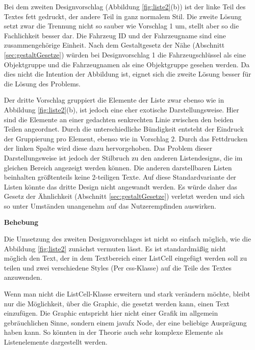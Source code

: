 Bei dem zweiten Designvorschlag (Abbildung \ref{fig:liste2}(b)) ist der linke Teil des Textes fett gedruckt, der andere Teil in ganz normalem Stil. Die zweite Lösung setzt zwar die Trennung nicht so sauber wie Vorschlag 1 um, stellt aber so die Fachlichkeit besser dar. Die Fahrzeug ID und der Fahrzeugname sind eine zusammengehörige Einheit. Nach dem Gestaltgesetz der Nähe (Abschnitt \ref{sec:gestaltGesetze}) würden bei Designvorschlag 1 die Fahrzeugschlüssel als eine Objektgruppe und die Fahrzeugnamen als eine Objektgruppe gesehen werden. Da dies nicht die Intention der Abbildung ist, eignet sich die zweite Lösung besser für die Lösung des Problems.

Der dritte Vorschlag gruppiert die Elemente der Liste zwar ebenso wie in Abbildung \ref{fig:liste2}(b), ist jedoch eine eher exotische Darstellungsweise. Hier sind die Elemente an einer gedachten senkrechten Linie zwischen den beiden Teilen angeordnet. Durch die unterschiedliche Bündigkeit entsteht der Eindruck der Gruppierung pro Element, ebenso wie in Vorschlag 2. Durch das Fettdrucken der linken Spalte wird diese dazu hervorgehoben. Das Problem dieser Darstellungsweise ist jedoch der Stilbruch zu den anderen Listendesigns, die im gleichen Bereich angezeigt werden können. Die anderen darstellbaren Listen beinhalten größtenteils keine 2-teiligen Texte. Auf diese Standardvariante der Listen könnte das dritte Design nicht angewandt werden. Es würde daher das Gesetz der Ähnlichkeit (Abschnitt \ref{sec:gestaltGesetze}) verletzt werden und sich so unter Umständen unangenehm auf das Nutzerempfinden auswirken.

\textbf{Behebung}

Die Umsetzung des zweiten Designvorschlages ist nicht so einfach möglich, wie die Abbildung \ref{fig:liste2} zunächst vermuten lässt. Es ist standardmäßig nicht möglich den Text, der in dem Textbereich einer ListCell eingefügt werden soll zu teilen und zwei verschiedene Styles (Per \gls{css}-Klasse) auf die Teile des Textes anzuwenden.

Wenn man nicht die ListCell-Klasse erweitern und stark verändern möchte, bleibt nur die Möglichkeit, über die Graphic, die gesetzt werden kann, einen Text einzufügen. Die Graphic entspricht hier nicht einer Grafik im allgemein gebräuchlichen Sinne, sondern einem \gls{javafx} Node, der eine beliebige Ausprägung haben kann. So könnten in der Theorie auch sehr komplexe Elemente als Listenelemente dargestellt werden.

